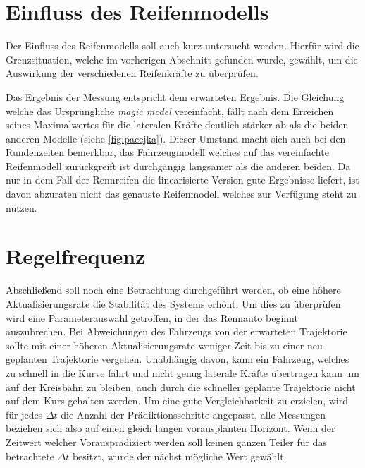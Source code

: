 \documentclass{like}
\begin{document}
\section{Einfluss des Reifenmodells}
Der Einfluss des Reifenmodells soll auch kurz untersucht werden. Hierfür wird die Grenzsituation, welche im vorherigen Abschnitt gefunden wurde, gewählt, um die Auswirkung der verschiedenen Reifenkräfte zu überprüfen.


\begin{figure}
	\centering
	 
	\caption{}
	\label{fig:tireModelDiff}
\end{figure}

Das Ergebnis der Messung entspricht dem erwarteten Ergebnis. Die Gleichung welche das Ursprüngliche \emph{magic model} vereinfacht, fällt nach dem Erreichen seines Maximalwertes für die lateralen Kräfte deutlich stärker ab als die beiden anderen Modelle (siehe \ref{fig:pacejka}). Dieser Umstand macht sich auch bei den Rundenzeiten bemerkbar, das Fahrzeugmodell welches auf das vereinfachte Reifenmodell zurückgreift ist durchgängig langsamer als die anderen beiden. Da nur in dem Fall der Rennreifen die linearisierte Version gute Ergebnisse liefert, ist davon abzuraten nicht das genauste Reifenmodell welches zur Verfügung steht zu nutzen.    


\section{Regelfrequenz}
Abschließend soll noch eine Betrachtung durchgeführt werden, ob eine höhere Aktualisierungsrate die Stabilität des Systems erhöht. Um dies zu überprüfen wird eine Parameterauswahl getroffen, in der das Rennauto beginnt auszubrechen. Bei Abweichungen des Fahrzeugs von der erwarteten Trajektorie sollte mit einer höheren Aktualisierungsrate weniger Zeit bis zu einer neu geplanten Trajektorie vergehen. Unabhängig davon, kann ein Fahrzeug, welches zu schnell in die Kurve fährt und nicht genug laterale Kräfte übertragen kann um auf der Kreisbahn zu bleiben, auch durch die schneller geplante Trajektorie nicht auf dem Kurs gehalten werden. 
Um eine gute Vergleichbarkeit zu erzielen, wird für jedes $\Delta t$ die Anzahl der Prädiktionsschritte angepasst, alle Messungen beziehen sich also auf einen gleich langen vorausplanten Horizont. Wenn der Zeitwert welcher Vorausprädiziert werden soll keinen ganzen Teiler für das betrachtete $\Delta t$ besitzt, wurde der nächst mögliche Wert gewählt.
\end{document}

